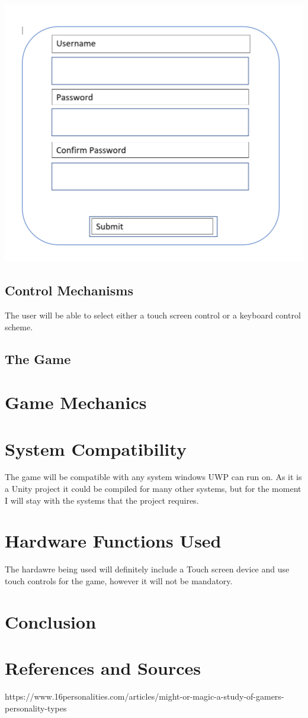\documentclass{article}
\begin{document}
\begin{minipage}{0.5\textwidth}
\includegraphics[width=\linewidth]{createaccount}
\end{minipage} \hfill
\subsection{Control Mechanisms}
The user will be able to select either a touch screen control or a keyboard control scheme. 
\subsection{The Game}
\section{Game Mechanics}
\section{System Compatibility}
The game will be compatible with any system windows UWP can run on. As it is a Unity project it could be compiled for many other systems, but for the moment I will stay with the systems that the project requires.
\section{Hardware Functions Used}
The hardawre being used will definitely include a Touch screen device and use touch controls for the game, however it will not be mandatory.
\section{Conclusion}
\section{References and Sources}
https://www.16personalities.com/articles/might-or-magic-a-study-of-gamers-personality-types 
\end{document}
